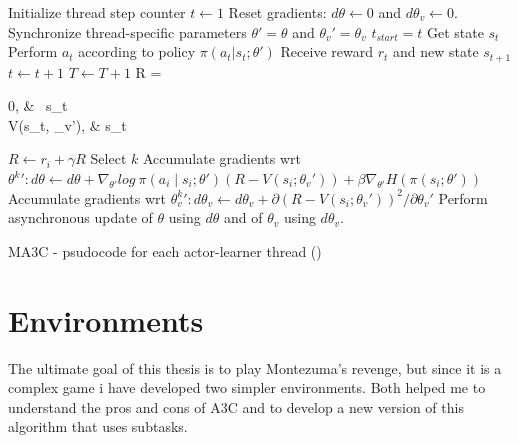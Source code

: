 \begin{algorithm}[hbtp]
\begin{algorithmic}
    \State {}
    \State {}
    \State {}
    \State Initialize thread step counter $t \leftarrow 1$
    \Repeat
        \State Reset gradients: $d\theta \leftarrow 0$ and $d\theta_v \leftarrow 0$.
        \State Synchronize thread-specific parameters $\theta' = \theta$ and $\theta_v' = \theta_v$
        \State $t_{start} = t$
        \State Get state $s_t$
        \Repeat
            \State Perform $a_t$ according to policy $\pi(a_t|s_t;\theta')$
            \State Receive reward $r_t$ and new state $s_{t+1}$
            \State $t \leftarrow t + 1$
            \State $T \leftarrow T + 1$
        \State R = \begin{cases}
                0,   & \ s_t \\
                V(s_t, \theta_v'),   &  s_t \;\\
            \end{cases}
            \State $R \leftarrow r_i + \gamma R$
            \State Select $k$ \;
            \State Accumulate gradients wrt $\theta^k': d\theta \leftarrow d\theta + \nabla_{\theta'} log\:\pi(a_i\mid s_i;\theta')(R-V(s_i;\theta_v'))+\beta\nabla_{\theta'}H(\pi(s_i;\theta'))$
            \State Accumulate gradients wrt $\theta^k_v': d\theta_v \leftarrow d\theta_v + \partial(R-V(s_i;\theta_v'))^2 / \partial \theta_{v}'$
        \EndFor
        \State Perform asynchronous update of $\theta$ using $d\theta$ and of $\theta_v$ using $d\theta_v$.
\end{algorithmic}
\caption{\acl{MA3C} - psudocode for each actor-learner thread (\cite{mnih2016A3C})}
\label{alg:MA3C}
\end{algorithm}

\section{Environments}
The ultimate goal of this thesis is to play Montezuma's revenge, but since it is a complex game i have developed two
simpler environments.
Both helped me to understand the pros and cons of \ac{A3C} and to develop a new version of this algorithm that uses subtasks.

